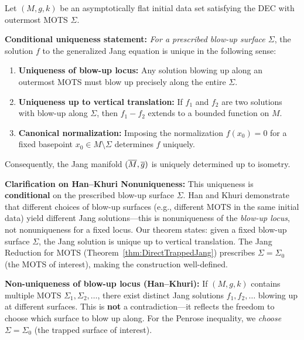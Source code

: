 \begin{theorem}\label{thm:JangUniqueness}
Let $(M, g, k)$ be an asymptotically flat initial data set satisfying the DEC with outermost MOTS $\Sigma$. 

\textbf{Conditional uniqueness statement:} \emph{For a prescribed blow-up surface $\Sigma$}, the solution $f$ to the generalized Jang equation is unique in the following sense:
\begin{enumerate}
    \item \textbf{Uniqueness of blow-up locus:} Any solution blowing up along an outermost MOTS must blow up precisely along the entire $\Sigma$.
    \item \textbf{Uniqueness up to vertical translation:} If $f_1$ and $f_2$ are two solutions with blow-up along $\Sigma$, then $f_1 - f_2$ extends to a bounded function on $M$.
    \item \textbf{Canonical normalization:} Imposing the normalization $f(x_0) = 0$ for a fixed basepoint $x_0 \in M \setminus \Sigma$ determines $f$ uniquely.
\end{enumerate}
Consequently, the Jang manifold $(\overline{M}, \overline{g})$ is uniquely determined up to isometry.

\textbf{Clarification on Han--Khuri Nonuniqueness:} This uniqueness is \textbf{conditional} on the prescribed blow-up surface $\Sigma$. Han and Khuri \cite{hankhuri2013} demonstrate that different choices of blow-up surfaces (e.g., different MOTS in the same initial data) yield different Jang solutions---this is nonuniqueness of the \emph{blow-up locus}, not nonuniqueness for a fixed locus. Our theorem states: given a fixed blow-up surface $\Sigma$, the Jang solution is unique up to vertical translation. The Jang Reduction for MOTS (Theorem~\ref{thm:DirectTrappedJang}) prescribes $\Sigma = \Sigma_0$ (the MOTS of interest), making the construction well-defined.

\textbf{Non-uniqueness of blow-up locus (Han--Khuri):} If $(M, g, k)$ contains multiple MOTS $\Sigma_1, \Sigma_2, \ldots$, there exist distinct Jang solutions $f_1, f_2, \ldots$ blowing up at different surfaces. This is \textbf{not} a contradiction---it reflects the freedom to choose which surface to blow up along. For the Penrose inequality, we \emph{choose} $\Sigma = \Sigma_0$ (the trapped surface of interest).
\end{theorem}

